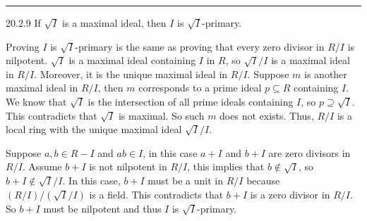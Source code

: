 \documentclass[letterpaper, 12pt]{article}
\begin{document}
\noindent\rule{7in}{2.8pt}
\begin{problem}{20.2.9}
If \(\sqrt{I}\) is a maximal ideal, then \(I\) is \(\sqrt{I}\)-primary. 
\end{problem}
\begin{solution}
Proving \(I\) is \(\sqrt{I}\)-primary is the same as proving that every zero divisor in \(R/I\) is nilpotent. \(\sqrt{I}\) is a maximal ideal containing \(I\) in \(R\), so \(\sqrt{I}/I\) is a maximal ideal in \(R/I\). Moreover, it is the unique maximal ideal in \(R/I\). Suppose \(m\) is another maximal ideal in \(R/I\), then \(m\) corresponds to a prime ideal \(p\subseteq R\) containing \(I\). We know that \(\sqrt{I}\) is the intersection of all prime ideals containing \(I\), so \(p\supseteq \sqrt{I}\). This contradicts that \(\sqrt{I}\) is maximal. So such \(m\) does not exists. Thus, \(R/I\) is a local ring with the unique maximal ideal \(\sqrt{I}/I\). 

Suppose \(a,b\in R-I\) and \(ab\in I\), in this case \(a+I\) and \(b+I\) are zero divisors in \(R/I\). Assume \(b+I\) is not nilpotent in \(R/I\), this implies that \(b\notin \sqrt{I}\), so \(b+I\notin \sqrt{I}/I\). In this case, \(b+I\) must be a unit in \(R/I\) because \((R/I)/(\sqrt{I}/I)\) is a field. This contradicts that \(b+I\) is a zero divisor in \(R/I\). So \(b+I\) must be nilpotent and thus \(I\) is \(\sqrt{I}\)-primary. 
\end{solution}
\end{document}
